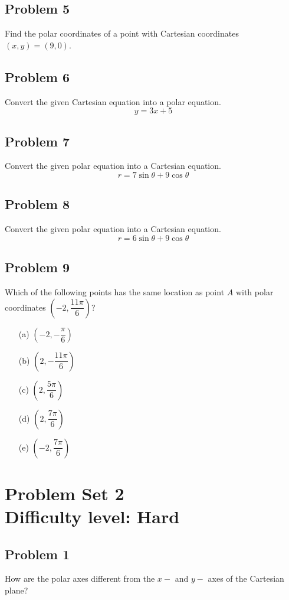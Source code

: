 \documentclass[12pt]{article}
\begin{document}
\subsection*{Problem 5}
Find the polar coordinates of a point with Cartesian coordinates \((x,y)=(9,0)\).

\subsection*{Problem 6}
Convert the given Cartesian equation into a polar equation.
\[y=3x+5\]

\subsection*{Problem 7}
Convert the given polar equation into a Cartesian equation.
\[r=7\sin \theta + 9\cos \theta\]

\subsection*{Problem 8}
Convert the given polar equation into a Cartesian equation.
\[r=6\sin \theta + 9\cos \theta\]

\subsection*{Problem 9}
Which of the following points has the same location as point \(A\) with polar coordinates \((-2,\dfrac{11\pi}{6})\)?

    \begin{itemize}
        \item[(a)] \(\left( -2, -\dfrac{\pi}{6} \right)\)
        \item[(b)] \(\left( 2, -\dfrac{11\pi}{6} \right)\)
        \item[(c)] \(\left( 2, \dfrac{5\pi}{6} \right)\)
        \item[(d)] \(\left( 2, \dfrac{7\pi}{6} \right)\)
        \item[(e)] \(\left( -2, \dfrac{7\pi}{6} \right)\)
    \end{itemize}

\section*{Problem Set 2\\Difficulty level: Hard}
\subsection*{Problem 1}
How are the polar axes different from the \(x-\) and \(y-\) axes of the Cartesian plane?
\end{document}
